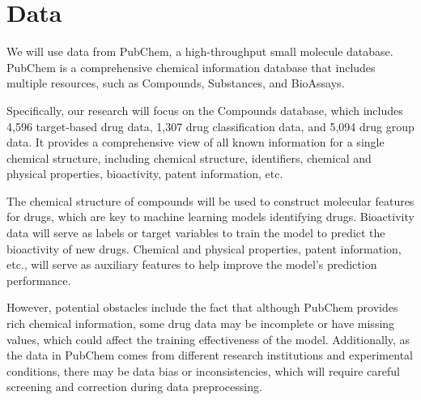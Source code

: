 \documentclass{ctexart}
\begin{document}
\section{Data}

We will use data from PubChem, a high-throughput small molecule database. PubChem is a comprehensive chemical information database that includes multiple resources, such as Compounds, Substances, and BioAssays. 

Specifically, our research will focus on the Compounds database, which includes 4,596 target-based drug data, 1,307 drug classification data, and 5,094 drug group data. It provides a comprehensive view of all known information for a single chemical structure, including chemical structure, identifiers, chemical and physical properties, bioactivity, patent information, etc. 

The chemical structure of compounds will be used to construct molecular features for drugs, which are key to machine learning models identifying drugs. Bioactivity data will serve as labels or target variables to train the model to predict the bioactivity of new drugs. Chemical and physical properties, patent information, etc., will serve as auxiliary features to help improve the model’s prediction performance.

However, potential obstacles include the fact that although PubChem provides rich chemical information, some drug data may be incomplete or have missing values, which could affect the training effectiveness of the model. Additionally, as the data in PubChem comes from different research institutions and experimental conditions, there may be data bias or inconsistencies, which will require careful screening and correction during data preprocessing.
\end{document}

